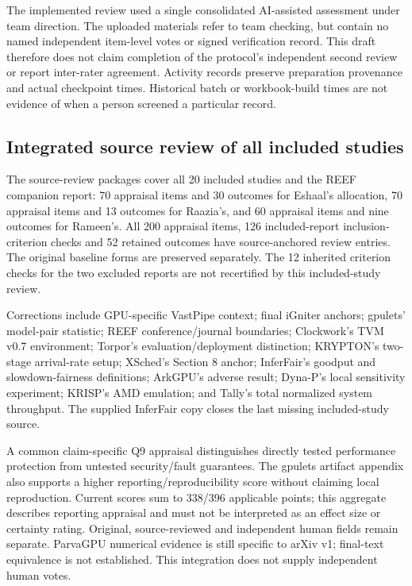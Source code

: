 The implemented review used a single consolidated AI-assisted assessment under team direction. The uploaded materials refer to team checking, but contain no named independent item-level votes or signed verification record. This draft therefore does not claim completion of the protocol's independent second review or report inter-rater agreement. Activity records preserve preparation provenance and actual checkpoint times. Historical batch or workbook-build times are not evidence of when a person screened a particular record.

\subsection{Integrated source review of all included studies}
The source-review packages cover all 20 included studies and the REEF companion report: 70 appraisal items and 30 outcomes for Eshaal's allocation, 70 appraisal items and 13 outcomes for Raazia's, and 60 appraisal items and nine outcomes for Rameen's. All 200 appraisal items, 126 included-report inclusion-criterion checks and 52 retained outcomes have source-anchored review entries. The original baseline forms are preserved separately. The 12 inherited criterion checks for the two excluded reports are not recertified by this included-study review.

Corrections include GPU-specific VastPipe context; final iGniter anchors; gpulets' model-pair statistic; REEF conference/journal boundaries; Clockwork's TVM v0.7 environment; Torpor's evaluation/deployment distinction; KRYPTON's two-stage arrival-rate setup; XSched's Section 8 anchor; InferFair's goodput and slowdown-fairness definitions; ArkGPU's adverse result; Dyna-P's local sensitivity experiment; KRISP's AMD emulation; and Tally's total normalized system throughput. The supplied InferFair copy closes the last missing included-study source.

A common claim-specific Q9 appraisal distinguishes directly tested performance protection from untested security/fault guarantees. The gpulets artifact appendix also supports a higher reporting/reproducibility score without claiming local reproduction. Current scores sum to 338/396 applicable points; this aggregate describes reporting appraisal and must not be interpreted as an effect size or certainty rating. Original, source-reviewed and independent human fields remain separate. ParvaGPU numerical evidence is still specific to arXiv v1; final-text equivalence is not established. This integration does not supply independent human votes.

